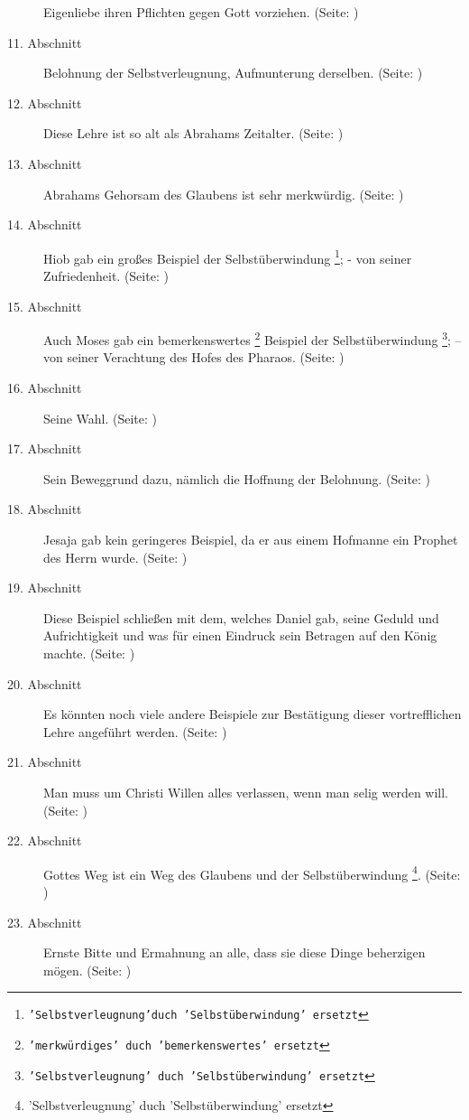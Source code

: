 \begin{description}
Eigenliebe ihren Pflichten gegen Gott vorziehen. (Seite: \pageref{kap4_ab10})
\item[11. Abschnitt] Belohnung der Selbstverleugnung, Aufmunterung derselben.
(Seite: \pageref{kap4_ab11})
\item[12. Abschnitt] Diese Lehre ist so alt als Abrahams Zeitalter. (Seite:
\pageref{kap4_ab12})
\item[13. Abschnitt] Abrahams Gehorsam des Glaubens ist sehr merkwürdig. (Seite:
\pageref{kap4_ab13})
\item[14. Abschnitt] Hiob gab ein großes Beispiel der Selbstüberwindung
\footnote{\texttt{'Selbstverleugnung'duch 'Selbstüberwindung' ersetzt}}; - von
seiner Zufriedenheit. (Seite: \pageref{kap4_ab14})
\item[15. Abschnitt] Auch Moses gab ein bemerkenswertes
\footnote{\texttt{'merkwürdiges' duch 'bemerkenswertes' ersetzt}} Beispiel der
Selbstüberwindung \footnote{\texttt{'Selbstverleugnung' duch 'Selbstüberwindung'
ersetzt}}; -- von seiner Verachtung des Hofes des Pharaos. (Seite:
\pageref{kap4_ab15})
\item[16. Abschnitt] Seine Wahl. (Seite: \pageref{kap4_ab16})
\item[17. Abschnitt] Sein Beweggrund dazu, nämlich die Hoffnung der Belohnung.
(Seite: \pageref{kap4_ab17})
\item[18. Abschnitt] Jesaja gab kein geringeres Beispiel, da er aus einem
Hofmanne ein Prophet des Herrn wurde. (Seite: \pageref{kap4_ab18})
\item[19. Abschnitt] Diese Beispiel schließen mit dem, welches Daniel gab,
seine Geduld und Aufrichtigkeit und was für einen Eindruck sein Betragen auf
den König machte. (Seite: \pageref{kap4_ab19})
\item[20. Abschnitt] Es könnten noch viele andere Beispiele zur Bestätigung
dieser vortrefflichen Lehre angeführt werden. (Seite: \pageref{kap4_ab20})
\item[21. Abschnitt] Man muss um Christi Willen alles verlassen, wenn man selig
werden will. (Seite: \pageref{kap4_ab21})
\item[22. Abschnitt] Gottes Weg ist ein Weg des Glaubens und der
Selbstüberwindung \footnote{'Selbstverleugnung' duch 'Selbstüberwindung'
ersetzt}. (Seite: \pageref{kap4_ab22})
\item[23. Abschnitt] Ernste Bitte und Ermahnung an alle, dass sie diese Dinge
beherzigen mögen. (Seite: \pageref{kap4_ab23})
\end{description}
\normalsize


